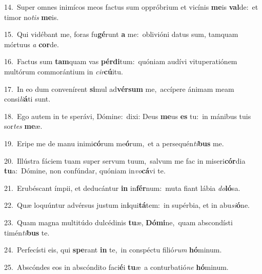 {\numbfont\textcolor{\numbcolor}{14.}}~Super omnes inimícos meos factus sum oppróbrium et vicínis \textbf{me}\-is \textbf{val}\-de:~\star et timor no\textit{tis} \textbf{me}\-is.\par
{\numbfont\textcolor{\numbcolor}{15.}}~Qui vidébant me, foras fu\-\textbf{gé}\-runt \textbf{a} me:~\star oblivióni datus sum, tamquam mórtuus \textit{a} \textbf{cor}\-de.\par
{\numbfont\textcolor{\numbcolor}{16.}}~Factus sum \textbf{tam}\-quam vas \textbf{pér}\-\textbf{di}tum:~\star quóniam audívi vituperatiónem multórum commorántium in \textit{cir}\-\textbf{cú}itu.\par
{\numbfont\textcolor{\numbcolor}{17.}}~In eo dum convenírent \textbf{si}\-mul ad\-\textbf{vér}\-\textbf{sum} me,~\star accípere ánimam meam consi\-\textit{li}\-\textbf{á}ti sunt.\par
{\numbfont\textcolor{\numbcolor}{18.}}~Ego autem in te sperávi, Dómine:~\dagger dixi: Deus \textbf{me}\-us \textbf{es} tu:~\star in mánibus tuis sor\textit{tes} \textbf{me}\-æ.\par
{\numbfont\textcolor{\numbcolor}{19.}}~Eripe me de manu inimi\-\textbf{có}\-rum me\-\textbf{ó}\-rum,~\star et a persequén\-\textit{ti}\-\textbf{bus} me.\par
{\numbfont\textcolor{\numbcolor}{20.}}~Illústra fáciem tuam super servum tuum,~\dagger salvum me fac in miseri\-\textbf{cór}\-dia \textbf{tu}\-a:~\star Dómine, non confúndar, quóniam in\-\textit{vo}\-\textbf{cá}vi te.\par
{\numbfont\textcolor{\numbcolor}{21.}}~Erubéscant ímpii, et deducántur \textbf{in} in\-\textbf{fér}\-num:~\star muta fiant lábia \textit{do}\-\textbf{ló}sa.\par
{\numbfont\textcolor{\numbcolor}{22.}}~Quæ loquúntur advérsus justum in\-\textbf{i}\-qui\-\textbf{tá}\-tem:~\star in supérbia, et in abu\-\textit{si}\-\textbf{ó}ne.\par
{\numbfont\textcolor{\numbcolor}{23.}}~Quam magna multitúdo dulcédinis \textbf{tu}\-æ, \textbf{Dó}\-\textbf{mi}ne,~\star quam abscondísti timén\-\textit{ti}\-\textbf{bus} te.\par
{\numbfont\textcolor{\numbcolor}{24.}}~Perfecísti eis, qui \textbf{spe}\-rant \textbf{in} te,~\star in conspéctu filió\textit{rum} \textbf{hó}\-minum.\par
{\numbfont\textcolor{\numbcolor}{25.}}~Abscóndes eos in abscóndito faci\-\textbf{é}\-i \textbf{tu}\-æ~\star a conturbatió\textit{ne} \textbf{hó}\-minum.\par
